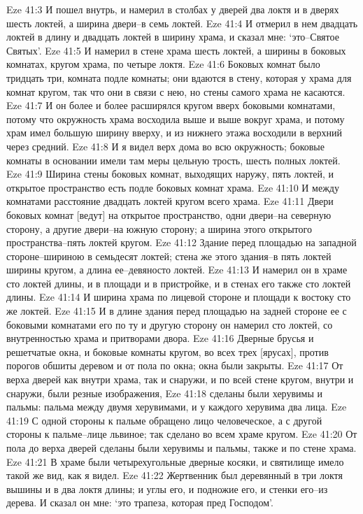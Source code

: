 Eze 41:3  И пошел внутрь, и намерил в столбах у дверей два локтя и в дверях шесть локтей, а ширина двери--в семь локтей.
Eze 41:4  И отмерил в нем двадцать локтей в длину и двадцать локтей в ширину храма, и сказал мне: `это--Святое Святых'.
Eze 41:5  И намерил в стене храма шесть локтей, а ширины в боковых комнатах, кругом храма, по четыре локтя.
Eze 41:6  Боковых комнат было тридцать три, комната подле комнаты; они вдаются в стену, которая у храма для комнат кругом, так что они в связи с нею, но стены самого храма не касаются.
Eze 41:7  И он более и более расширялся кругом вверх боковыми комнатами, потому что окружность храма восходила выше и выше вокруг храма, и потому храм имел большую ширину вверху, и из нижнего этажа восходили в верхний через средний.
Eze 41:8  И я видел верх дома во всю окружность; боковые комнаты в основании имели там меры цельную трость, шесть полных локтей.
Eze 41:9  Ширина стены боковых комнат, выходящих наружу, пять локтей, и открытое пространство есть подле боковых комнат храма.
Eze 41:10  И между комнатами расстояние двадцать локтей кругом всего храма.
Eze 41:11  Двери боковых комнат [ведут] на открытое пространство, одни двери--на северную сторону, а другие двери--на южную сторону; а ширина этого открытого пространства--пять локтей кругом.
Eze 41:12  Здание перед площадью на западной стороне--шириною в семьдесят локтей; стена же этого здания--в пять локтей ширины кругом, а длина ее--девяносто локтей.
Eze 41:13  И намерил он в храме сто локтей длины, и в площади и в пристройке, и в стенах его также сто локтей длины.
Eze 41:14  И ширина храма по лицевой стороне и площади к востоку сто же локтей.
Eze 41:15  И в длине здания перед площадью на задней стороне ее с боковыми комнатами его по ту и другую сторону он намерил сто локтей, со внутренностью храма и притворами двора.
Eze 41:16  Дверные брусья и решетчатые окна, и боковые комнаты кругом, во всех трех [ярусах], против порогов обшиты деревом и от пола по окна; окна были закрыты.
Eze 41:17  От верха дверей как внутри храма, так и снаружи, и по всей стене кругом, внутри и снаружи, были резные изображения,
Eze 41:18  сделаны были херувимы и пальмы: пальма между двумя херувимами, и у каждого херувима два лица.
Eze 41:19  С одной стороны к пальме обращено лицо человеческое, а с другой стороны к пальме--лице львиное; так сделано во всем храме кругом.
Eze 41:20  От пола до верха дверей сделаны были херувимы и пальмы, также и по стене храма.
Eze 41:21  В храме были четырехугольные дверные косяки, и святилище имело такой же вид, как я видел.
Eze 41:22  Жертвенник был деревянный в три локтя вышины и в два локтя длины; и углы его, и подножие его, и стенки его--из дерева. И сказал он мне: `это трапеза, которая пред Господом'.
